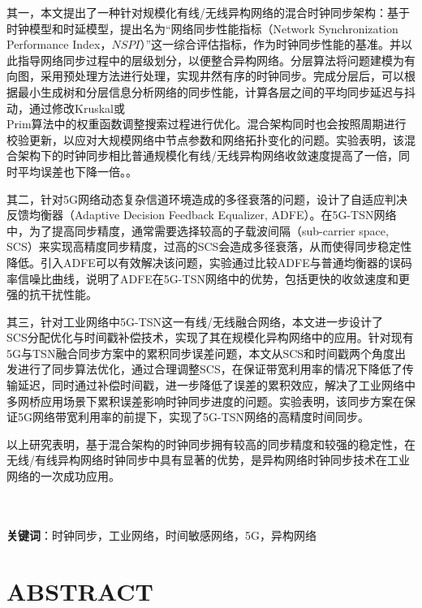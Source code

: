 \documentclass[UTF8,a4paper,12pt]{ctexart}
\numberwithin{equation}{section}
\begin{document}
	其一，本文提出了一种针对规模化有线/无线异构网络的混合时钟同步架构：基于时钟模型和时延模型，提出名为“网络同步性能指标（Network Synchronization Performance Index，$NSPI$）”这一综合评估指标，作为时钟同步性能的基准。并以此指导网络同步过程中的层级划分，以便整合异构网络。分层算法将问题建模为有向图，采用预处理方法进行处理，实现井然有序的时钟同步。完成分层后，可以根据最小生成树和分层信息分析网络的同步性能，计算各层之间的平均同步延迟与抖动，通过修改Kruskal或\\Prim算法中的权重函数调整搜索过程进行优化。混合架构同时也会按照周期进行校验更新，以应对大规模网络中节点参数和网络拓扑变化的问题。实验表明，该混合架构下的时钟同步相比普通规模化有线/无线异构网络收敛速度提高了一倍，同时平均误差也下降一倍。。
	
	其二，针对5G网络动态复杂信道环境造成的多径衰落的问题，设计了自适应判决反馈均衡器（Adaptive Decision Feedback Equalizer, ADFE）。在5G-TSN网络中，为了提高同步精度，通常需要选择较高的子载波间隔（sub-carrier space, SCS）来实现高精度同步精度，过高的SCS会造成多径衰落，从而使得同步稳定性降低。引入ADFE可以有效解决该问题，实验通过比较ADFE与普通均衡器的误码率信噪比曲线，说明了ADFE在5G-TSN网络中的优势，包括更快的收敛速度和更强的抗干扰性能。
	
	其三，针对工业网络中5G-TSN这一有线/无线融合网络，本文进一步设计了\\SCS分配优化与时间戳补偿技术，实现了其在规模化异构网络中的应用。针对现有5G与TSN融合同步方案中的累积同步误差问题，本文从SCS和时间戳两个角度出发进行了同步算法优化，通过合理调整SCS，在保证带宽利用率的情况下降低了传输延迟，同时通过补偿时间戳，进一步降低了误差的累积效应，解决了工业网络中多网桥应用场景下累积误差影响时钟同步进度的问题。实验表明，该同步方案在保证5G网络带宽利用率的前提下，实现了5G-TSN网络的高精度时间同步。
	
	以上研究表明，基于混合架构的时钟同步拥有较高的同步精度和较强的稳定性，在无线/有线异构网络时钟同步中具有显著的优势，是异构网络时钟同步技术在工业网络的一次成功应用。
	
	\hspace{8mm}\\
	~\\
	\textbf{关键词}：时钟同步，工业网络，时间敏感网络，5G，异构网络\\
	
	\newpage
	\section*{ABSTRACT}
	
\end{document}
